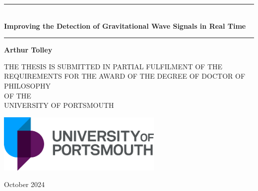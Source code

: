 \begin{titlepage}
   \begin{center}

        \vspace*{1.5cm}

   
        \rule{\textwidth}{0.4pt}\\
        \vspace{0.4cm}
        \Huge \textbf{Improving the Detection of Gravitational Wave Signals in Real Time}
        \rule{\textwidth}{0.4pt}

        \vspace{1.0cm}
        \textbf{Arthur Tolley}

        \vspace{1.0cm}
            
        {\large THE THESIS IS SUBMITTED IN PARTIAL FULFILMENT OF THE REQUIREMENTS FOR THE AWARD OF THE DEGREE OF DOCTOR OF PHILOSOPHY}\\
        {\large OF THE}\\
        {\large UNIVERSITY OF PORTSMOUTH}

        \vspace{2.0cm}
     
       \includegraphics[width=0.6\textwidth]{images/preamble/UoP_Logo.pdf}
            
        \large October 2024
            
   \end{center}
\end{titlepage}